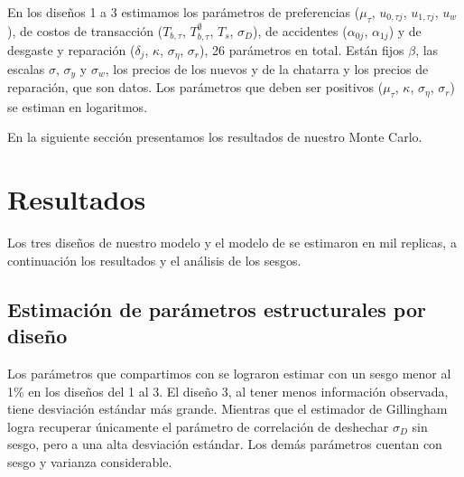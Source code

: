 \documentclass{article}
\begin{document}
En los diseños 1 a 3 estimamos los parámetros de preferencias ($\mu_\tau$, $u_{0,\tau j}$, $u_{1,\tau j}$, $u_w$), de costos de transacción ($T_{b,\tau}$, $T^{\emptyset}_{b,\tau}$, $T_s$, $\sigma_D$), de accidentes ($\alpha_{0j}$, $\alpha_{1j}$) y de desgaste y reparación ($\delta_j$, $\kappa$, $\sigma_\eta$, $\sigma_r$), 26 parámetros en total. Están fijos $\beta$, las escalas $\sigma$, $\sigma_y$ y $\sigma_w$, los precios de los nuevos y de la chatarra y los precios de reparación, que son datos. Los parámetros que deben ser positivos ($\mu_\tau$, $\kappa$, $\sigma_\eta$, $\sigma_r$) se estiman en logaritmos.

En la siguiente sección presentamos los resultados de nuestro Monte Carlo.




\section{Resultados}

Los tres diseños de nuestro modelo y el modelo de \textcite{Gillingham2022} se estimaron en mil replicas, a continuación los resultados y el análisis de los sesgos.


\subsection{Estimación de parámetros estructurales por diseño}

Los parámetros que compartimos con \textcite{Gillingham2022} se lograron estimar con un sesgo menor al 1\% en los diseños del 1 al 3. El diseño 3, al tener menos información observada, tiene desviación estándar más grande. Mientras que el estimador de Gillingham logra recuperar únicamente el parámetro de correlación de deshechar $\sigma_D$ sin sesgo, pero a una alta desviación estándar. Los demás parámetros cuentan con sesgo y varianza considerable. 
\end{document}
